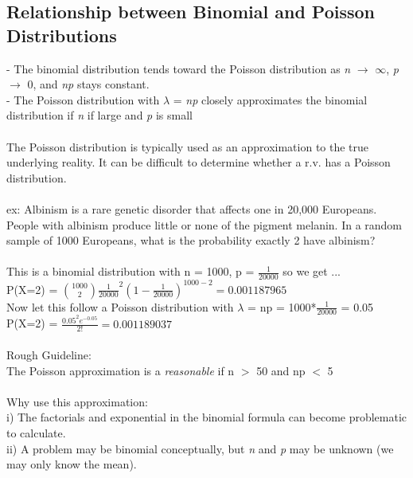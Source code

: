 \documentclass[12pt, a4paper]{article}
\begin{document}
	\subsection{Relationship between Binomial and Poisson Distributions}
	- The binomial distribution tends toward the Poisson distribution as \textit{n} $\rightarrow$ $\infty$, \textit{p} $\rightarrow$ 0, and \textit{np} stays constant. \\
	- The Poisson distribution with $\lambda$ = \textit{np} closely approximates the binomial distribution if \textit{n} if large and \textit{p} is small \\~\\
	The Poisson distribution is typically used as an approximation to the true underlying reality. It can be difficult to determine whether a r.v. has a Poisson distribution. \\~\\	
	ex: Albinism is a rare genetic disorder that affects one in 20,000 Europeans. People with albinism produce little or none of the pigment melanin. In a random sample of 1000 Europeans, what is the probability exactly 2 have albinism? \\~\\
	This is a binomial distribution with n = 1000, p = $\frac{1}{20000}$ so we get ...\\
	P(X=2) = $\binom{1000}{2} \frac{1}{20000}^2(1-\frac{1}{20000})^{1000-2}  = 0.001187965$ \\
	Now let this follow a Poisson distribution with $\lambda$ = np = 1000*$\frac{1}{20000}$ = 0.05 \\
	P(X=2) = $\frac{0.05^2e^{-0.05}}{2!} = 0.001189037$\\~\\
	Rough Guideline: \\
	The Poisson approximation is a \textit{reasonable} if n $>$ 50 and np $<$ 5 \\~\\
	Why use this approximation:\\
	i) The factorials and exponential in the binomial formula can become problematic to calculate. \\
	ii) A problem may be binomial conceptually, but \textit{n} and \textit{p} may be unknown (we may only know the mean). \\~\\
	
\end{document}

